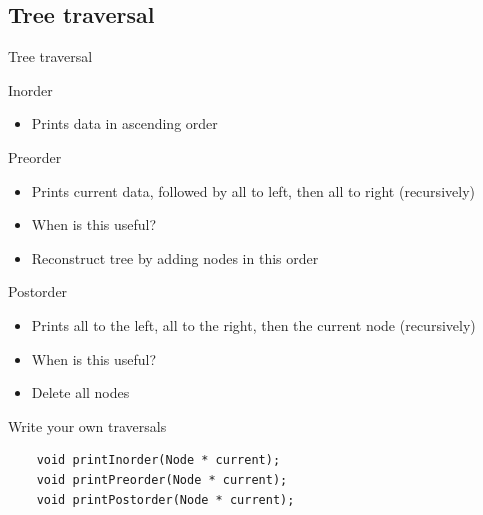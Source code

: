 \documentclass[aspectratio=169]{beamer}
\begin{document}

\subsection{Tree traversal}

\begin{frame}{Tree traversal}
  \begin{block}{Inorder}
    \begin{itemize}
    \item Prints data in ascending order
    \end{itemize}
  \end{block}
  \pause
  \begin{block}{Preorder}
    \begin{itemize}
    \item Prints current data, followed by all to left, then all to right
      (recursively)
    \item When is this useful?\pause
    \item Reconstruct tree by adding nodes in this order
    \end{itemize}
  \end{block}
  \pause
  \begin{block}{Postorder}
    \begin{itemize}
    \item Prints all to the left, all to the right, then the current
      node (recursively)
    \item When is this useful?\pause
    \item Delete all nodes
    \end{itemize}
  \end{block}
\end{frame}

\begin{frame}[fragile]{Write your own traversals}
  \begin{lstlisting}
    void printInorder(Node * current);
    void printPreorder(Node * current);
    void printPostorder(Node * current);
  \end{lstlisting}
\end{frame}

\end{document}
